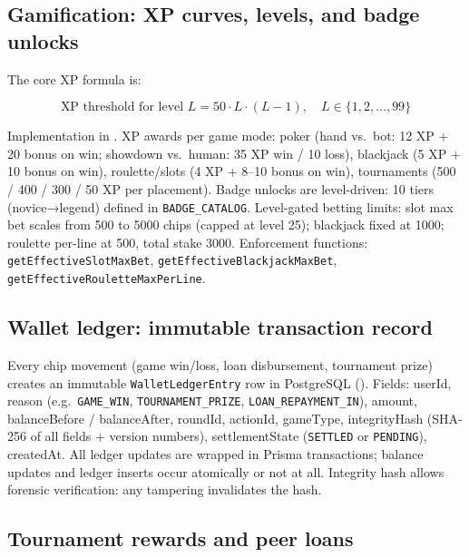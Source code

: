 \documentclass[11pt,a4paper]{article}
\begin{document}
\subsection{Gamification: XP curves, levels, and badge unlocks}

The core XP formula is:

\[
\text{XP threshold for level } L = 50 \cdot L \cdot (L - 1), \quad L \in \{1, 2, \ldots, 99\}
\]

Implementation in . XP awards per game mode: poker (hand vs.\ bot: 12 XP + 20 bonus on win; showdown vs.\ human: 35 XP win / 10 loss), blackjack (5 XP + 10 bonus on win), roulette/slots (4 XP + 8--10 bonus on win), tournaments (500 / 400 / 300 / 50 XP per placement). Badge unlocks are level-driven: 10 tiers (novice→legend) defined in \texttt{BADGE\_CATALOG}. Level-gated betting limits: slot max bet scales from 500 to 5000 chips (capped at level 25); blackjack fixed at 1000; roulette per-line at 500, total stake 3000. Enforcement functions: \texttt{getEffectiveSlotMaxBet}, \texttt{getEffectiveBlackjackMaxBet}, \texttt{getEffectiveRouletteMaxPerLine}.

\subsection{Wallet ledger: immutable transaction record}

Every chip movement (game win/loss, loan disbursement, tournament prize) creates an immutable \texttt{WalletLedgerEntry} row in PostgreSQL (). Fields: userId, reason (e.g.\ \texttt{GAME\_WIN}, \texttt{TOURNAMENT\_PRIZE}, \texttt{LOAN\_REPAYMENT\_IN}), amount, balanceBefore / balanceAfter, roundId, actionId, gameType, integrityHash (SHA-256 of all fields + version numbers), settlementState (\texttt{SETTLED} or \texttt{PENDING}), createdAt. All ledger updates are wrapped in Prisma transactions; balance updates and ledger inserts occur atomically or not at all. Integrity hash allows forensic verification: any tampering invalidates the hash.

\subsection{Tournament rewards and peer loans}
\end{document}
